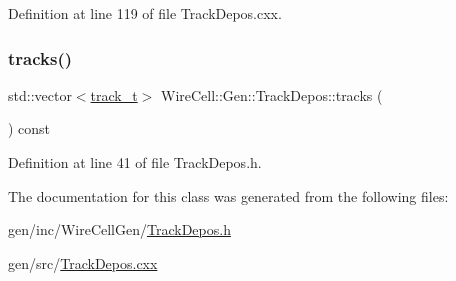 Definition at line 119 of file Track\+Depos.\+cxx.

\mbox{\label{class_wire_cell_1_1_gen_1_1_track_depos_a9a2eca2798c0655336150e7237e8c5cd}} 
\subsubsection{\texorpdfstring{tracks()}{tracks()}}
{\footnotesize\ttfamily std\+::vector$<$\hyperlink{class_wire_cell_1_1_gen_1_1_track_depos_a70b397dea6bfcd6d4181a1716b0f3e54}{track\+\_\+t}$>$ Wire\+Cell\+::\+Gen\+::\+Track\+Depos\+::tracks (\begin{DoxyParamCaption}{ }\end{DoxyParamCaption}) const\hspace{0.3cm}{\ttfamily [inline]}}



Definition at line 41 of file Track\+Depos.\+h.



The documentation for this class was generated from the following files\+:\begin{DoxyCompactItemize}
\item 
gen/inc/\+Wire\+Cell\+Gen/\hyperlink{_track_depos_8h}{Track\+Depos.\+h}\item 
gen/src/\hyperlink{_track_depos_8cxx}{Track\+Depos.\+cxx}\end{DoxyCompactItemize}
